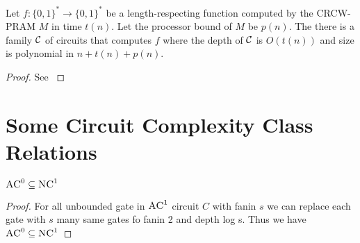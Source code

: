 \begin{theorem}\label{volthm2.56}
Let $f:\{0,1\}^*\to \{0,1\}^*$ be a length-respecting function computed by the  \textsc{CRCW-PRAM} $M$ in time $t(n)$. Let the processor bound of $M$ be $p(n)$. The there is a family $\mathcal{C}$ of circuits that computes $f$ where the depth of $\mathcal{C}$ is $O(t(n))$ and size is polynomial in $n+t(n)+p(n)$.
\end{theorem}
\begin{proof}
See \cite[Theorem 2.56, Page  70]{Vollmer_1999}
\end{proof}

\section{Some Circuit Complexity Class Relations}
\begin{theorem}
	$\textsc{AC}^0\subseteq \textsc{NC}^1$
\end{theorem}
\begin{proof}
	For all unbounded gate in $\textsc{AC}^1$ circuit $C$ with fanin $s$ we can replace each gate with $s$ many same gates fo fanin 2 and depth log s. Thus we have $\textsc{AC}^0\subseteq \textsc{NC}^1$
\end{proof}

